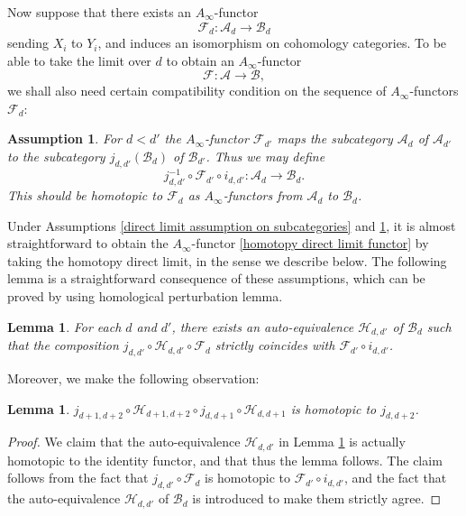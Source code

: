 \documentclass{amsart}
\newtheorem{lemma}[theorem]{Lemma}
\newtheorem{assumption}[theorem]{Assumption}
\numberwithin{equation}{section}
\numberwithin{figure}{section}
\begin{document}
	Now suppose that there exists an $A_{\infty}$-functor
\begin{equation}
\mathcal{F}_{d}: \mathcal{A}_{d} \to \mathcal{B}_{d}
\end{equation}
sending $X_{i}$ to $Y_{i}$, and induces an isomorphism on cohomology categories. To be able to take the limit over $d$ to obtain an $A_{\infty}$-functor
\begin{equation} \label{homotopy direct limit functor}
\mathcal{F}: \mathcal{A} \to \mathcal{B},
\end{equation}
we shall also need certain compatibility condition on the sequence of $A_{\infty}$-functors $\mathcal{F}_{d}$:
\begin{assumption} \label{direct limit assumption on functors}
For $d < d'$ the $A_{\infty}$-functor $\mathcal{F}_{d'}$ maps the subcategory $\mathcal{A}_{d}$ of $\mathcal{A}_{d'}$ to the subcategory $j_{d, d'}(\mathcal{B}_{d})$ of $\mathcal{B}_{d'}$. Thus we may define
\begin{equation}
j^{-1}_{d, d'} \circ \mathcal{F}_{d'} \circ i_{d, d'}: \mathcal{A}_{d} \to \mathcal{B}_{d}.
\end{equation}
This should be homotopic to $\mathcal{F}_{d}$ as $A_{\infty}$-functors from $\mathcal{A}_{d}$ to $\mathcal{B}_{d}$.
\end{assumption}
	Under Assumptions \ref{direct limit assumption on subcategories} and \ref{direct limit assumption on functors}, it is almost straightforward to obtain the $A_{\infty}$-functor \eqref{homotopy direct limit functor} by taking the homotopy direct limit, in the sense we describe below. The following lemma is a straightforward consequence of these assumptions, which can be proved by using homological perturbation lemma. \par

\begin{lemma} \label{auto-equivalences correcting homotopy commutativity to strict commutativity}
	For each $d$ and $d'$, there exists an auto-equivalence $\mathcal{H}_{d, d'}$ of $\mathcal{B}_{d}$ such that the composition $j_{d, d'} \circ \mathcal{H}_{d, d'} \circ \mathcal{F}_{d}$ strictly coincides with $\mathcal{F}_{d'} \circ i_{d, d'}$. 
\end{lemma}

	Moreover, we make the following observation: \par
\begin{lemma}
	$j_{d+1, d+2} \circ \mathcal{H}_{d+1, d+2} \circ j_{d, d+1} \circ \mathcal{H}_{d, d+1}$ is homotopic to $j_{d, d+2}$.
\end{lemma}
\begin{proof}
	We claim that the auto-equivalence $\mathcal{H}_{d, d'}$ in Lemma \ref{auto-equivalences correcting homotopy commutativity to strict commutativity} is actually homotopic to the identity functor, and that thus the lemma follows. The claim follows from the fact that $j_{d, d'} \circ \mathcal{F}_{d}$ is homotopic to $\mathcal{F}_{d'} \circ i_{d, d'}$, and the fact that the auto-equivalence $\mathcal{H}_{d, d'}$ of $\mathcal{B}_{d}$ is introduced to make them strictly agree.
\end{proof}
\end{document}
